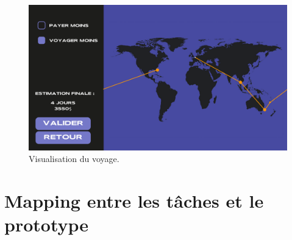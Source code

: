 \documentclass{article}
\begin{document}
\begin{figure}[!h]
	\centering
	\includegraphics[width=14.4cm]{assets/prototype/basse/onglet5}
	\caption{Visualisation du voyage.}
    \label{onglet5} 
\end{figure}

\clearpage
\section{Mapping entre les tâches et le prototype}
\end{document}
